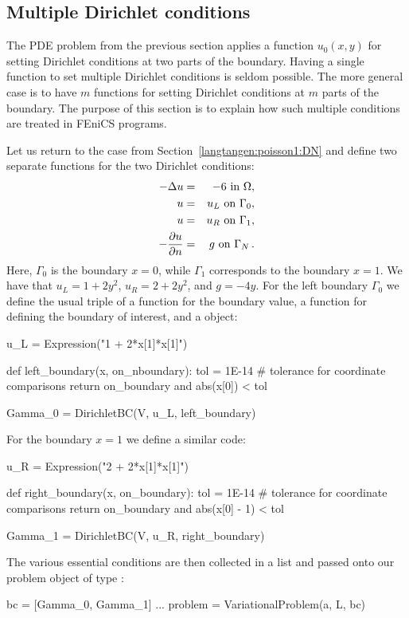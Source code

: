 \subsection{Multiple Dirichlet conditions}
\label{langtangen:poisson:multiple:Dirichlet}

The PDE problem from the previous section applies a function
$u_0(x,y)$ for setting Dirichlet conditions at two parts of the
boundary.  Having a single function to set multiple Dirichlet
conditions is seldom possible. The more general case is to have $m$
functions for setting Dirichlet conditions at $m$ parts of the
boundary. The purpose of this section is to explain how such multiple
conditions are treated in FEniCS programs.

Let us return to the case from Section~\ref{langtangen:poisson1:DN}
and define two separate functions for the two Dirichlet conditions:
\begin{eqnarray}
    - \Delta u &=& -6 \mbox{ in } \Omega, \\
    u &=& u_L \mbox{ on } \Gamma_0, \\
    u &=& u_R \mbox{ on } \Gamma_1, \\
    - \frac{\partial u}{\partial n} &=& g \mbox{ on } \Gamma_N \thinspace .
\end{eqnarray}
Here, $\Gamma_0$ is the boundary $x=0$, while $\Gamma_1$ corresponds
to the boundary $x=1$.  We have that $u_L = 1 + 2y^2$, $u_R = 2 +
2y^2$, and $g=-4y$.  For the left boundary $\Gamma_0$ we define the
usual triple of a function for the boundary value, a function for
defining the boundary of interest, and a
 object:
\begin{python}
u_L = Expression("1 + 2*x[1]*x[1]")

def left_boundary(x, on_nboundary):
    tol = 1E-14   # tolerance for coordinate comparisons
    return on_boundary and abs(x[0]) < tol

Gamma_0 = DirichletBC(V, u_L, left_boundary)
\end{python}

For the boundary $x=1$ we define a similar code:
\begin{python}
u_R = Expression("2 + 2*x[1]*x[1]")

def right_boundary(x, on_boundary):
    tol = 1E-14   # tolerance for coordinate comparisons
    return on_boundary and abs(x[0] - 1) < tol

Gamma_1 = DirichletBC(V, u_R, right_boundary)
\end{python}
The various essential conditions are then collected in a list and
passed onto our problem object of type
:
\begin{python}
bc = [Gamma_0, Gamma_1]
...
problem = VariationalProblem(a, L, bc)
\end{python}


